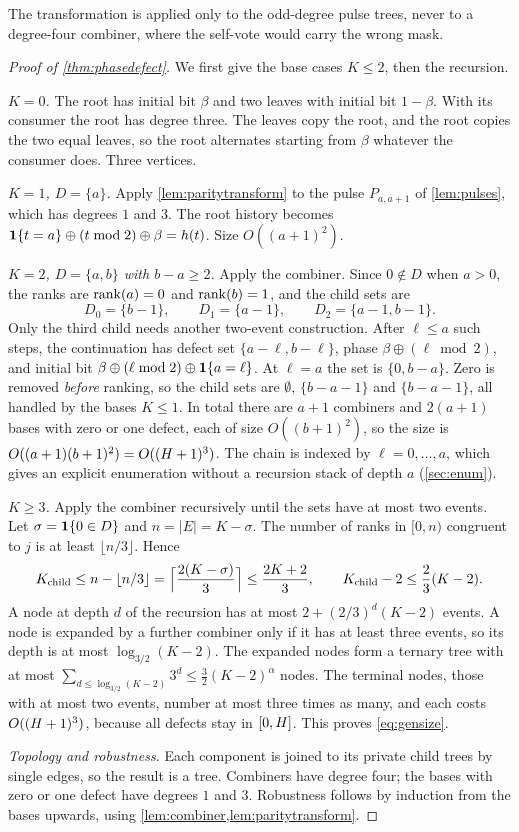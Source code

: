 The transformation is applied only to the odd-degree pulse trees, never to a degree-four combiner,
where the self-vote would carry the wrong mask.

\begin{proof}[Proof of \cref{thm:phasedefect}]
We first give the base cases $K\le 2$, then the recursion.

\emph{$K=0$.} The root has initial bit $\beta$ and two leaves with initial bit $1-\beta$. With its
consumer the root has degree three. The leaves copy the root, and the root copies the two equal
leaves, so the root alternates starting from $\beta$ whatever the consumer does. Three vertices.

\emph{$K=1$, $D=\{a\}$.} Apply \cref{lem:paritytransform} to the pulse $P_{a,a+1}$ of
\cref{lem:pulses}, which has degrees $1$ and $3$. The root history becomes
$\mathbf{1}\{t=a\}\oplus(t\bmod2)\oplus\beta=h(t)$. Size $O((a+1)^2)$.

\emph{$K=2$, $D=\{a,b\}$ with $b-a\ge 2$.} Apply the combiner. Since $0\notin D$ when $a>0$, the ranks
are $\operatorname{rank}(a)=0$ and $\operatorname{rank}(b)=1$, and the child sets are
\[
D_0=\{b-1\},\qquad D_1=\{a-1\},\qquad D_2=\{a-1,b-1\}.
\]
Only the third child needs another two-event construction. After $\ell\le a$ such steps, the
continuation has defect set $\{a-\ell,b-\ell\}$, phase $\beta\oplus(\ell\bmod2)$, and initial bit
$\beta\oplus(\ell\bmod 2)\oplus\mathbf{1}\{a=\ell\}$. At $\ell=a$ the set is $\{0,b-a\}$. Zero is removed
\emph{before} ranking, so the child sets are $\emptyset$, $\{b-a-1\}$ and $\{b-a-1\}$, all handled by
the bases $K\le1$. In total there are $a+1$ combiners and $2(a+1)$ bases with zero or one defect,
each of size $O((b+1)^2)$, so the size is $O((a+1)(b+1)^2)=O((H+1)^3)$. The chain is indexed by
$\ell=0,\dots,a$, which gives an explicit enumeration without a recursion stack of depth $a$
(\cref{sec:enum}).

\emph{$K\ge3$.} Apply the combiner recursively until the sets have at most two events. Let
$\sigma=\mathbf{1}\{0\in D\}$ and $n=|E|=K-\sigma$. The number of ranks in $[0,n)$ congruent to $j$ is at
least $\lfloor n/3\rfloor$. Hence
\[
K_{\text{child}}\le n-\lfloor n/3\rfloor=\Bigl\lceil\frac{2(K-\sigma)}{3}\Bigr\rceil\le\frac{2K+2}{3},
\qquad K_{\text{child}}-2\le\frac23(K-2).
\]
A node at depth $d$ of the recursion has at most $2+(2/3)^d(K-2)$ events. A node is expanded by a
further combiner only if it has at least three events, so its depth is at most $\log_{3/2}(K-2)$. The
expanded nodes form a ternary tree with at most
$\sum_{d\le\log_{3/2}(K-2)}3^d\le\tfrac32(K-2)^{\alpha}$ nodes. The terminal nodes, those with at
most two events, number at most three times as many, and each costs $O((H+1)^3)$, because all
defects stay in $[0,H]$. This proves \eqref{eq:gensize}.

\emph{Topology and robustness.} Each component is joined to its private child trees by single
edges, so the result is a tree. Combiners have degree four; the bases with zero or one defect have
degrees $1$ and $3$. Robustness follows by induction from the bases upwards, using
\cref{lem:combiner,lem:paritytransform}.
\end{proof}

